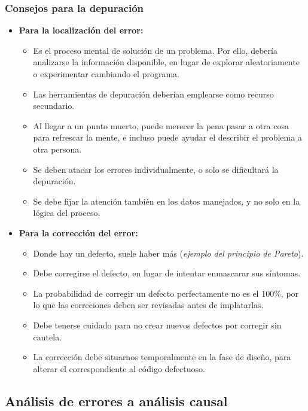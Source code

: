 \subsubsection{Consejos para la depuración}

\begin{itemize}
    \item \textbf{Para la localización del error:}
    \begin{itemize}
        \item Es el proceso mental de solución de un problema. Por ello, debería analizarse la información disponible, en lugar de explorar aleatoriamente o experimentar cambiando el programa.
        \item Las herramientas de depuración deberían emplearse como recurso secundario.
        \item Al llegar a un punto muerto, puede merecer la pena pasar a otra cosa para refrescar la mente, e incluso puede ayudar el describir el problema a otra persona.
        \item Se deben atacar los errores individualmente, o solo se dificultará la depuración.
        \item Se debe fijar la atención también en los datos manejados, y no solo en la lógica del proceso.
    \end{itemize}

    \item \textbf{Para la corrección del error:}
    \begin{itemize}
        \item Donde hay un defecto, suele haber más (\textit{ejemplo del principio de Pareto}).
        \item Debe corregirse el defecto, en lugar de intentar enmascarar sus síntomas.
        \item La probabilidad de corregir un defecto perfectamente no es el 100\%, por lo que las correciones deben ser revisadas antes de implatarlas.
        \item Debe tenerse cuidado para no crear nuevos defectos por corregir sin cautela.
        \item La corrección debe situarnos temporalmente en la fase de diseño, para alterar el correspondiente al código defectuoso.
    \end{itemize}
\end{itemize}

\subsection{Análisis de errores a análisis causal}

